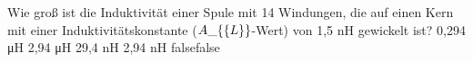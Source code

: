     {Wie groß ist die Induktivität einer Spule mit 14 Windungen, die auf einen Kern mit einer Induktivitätskonstante ($A\_\{\textrm\{L\}\}$-Wert) von 1,5 nH gewickelt ist?}
    {0,294 μH}
    {2,94 μH}
    {29,4 nH}
    {2,94 nH}
    {false}{false}